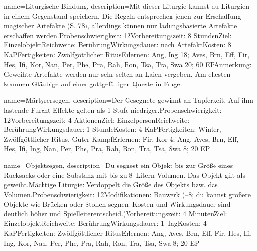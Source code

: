 {
    name={Liturgische Bindung},
    description={Mit dieser Liturgie kannst du Liturgien in einem Gegenstand speichern. Die Regeln entsprechen jenen zur Erschaffung magischer Artefakte (S. 78), allerdings können nur ladungsbasierte Artefakte erschaffen werden.\newline Probenschwierigkeit: 12\newline Vorbereitungszeit: 8 Stunden\newline Ziel: Einzelobjekt\newline Reichweite: Berührung\newline Wirkungsdauer: nach Artefakt\newline Kosten: 8 KaP\newline Fertigkeiten: Zwölfgöttlicher Ritus\newline Erlernen: Ang, Ing 18; Aves, Brn, Eff, Fir, Hes, Ifi, Kor, Nan, Per, Phe, Pra, Rah, Ron, Tsa, Tra, Swa 20; 60 EP\newline Anmerkung: Geweihte Artefakte werden nur sehr selten an Laien vergeben. Am ehesten kommen Gläubige auf einer gottgefälligen Queste in Frage.}
}


{
    name={Märtyrersegen},
    description={Der Gesegnete gewinnt an Tapferkeit. Auf ihm lastende Furcht-Effekte gelten als 1 Stufe niedriger.\newline Probenschwierigkeit: 12\newline Vorbereitungszeit: 4 Aktionen\newline Ziel: Einzelperson\newline Reichweite: Berührung\newline Wirkungsdauer: 1 Stunde\newline Kosten: 4 KaP\newline Fertigkeiten: Winter, Zwölfgöttlicher Ritus, Guter Kampf\newline Erlernen: Fir, Kor 4; Ang, Aves, Brn, Eff, Hes, Ifi, Ing, Nan, Per, Phe, Pra, Rah, Ron, Tra, Tsa, Swa 8; 20 EP}
}


{
    name={Objektsegen},
    description={Du segnest ein Objekt bis zur Größe eines Rucksacks oder eine Substanz mit bis zu 8 Litern Volumen. Das Objekt gilt als geweiht.\newline Mächtige Liturgie: Verdoppelt die Größe des Objekts bzw. das Volumen.\newline Probenschwierigkeit: 12\newline Modifikationen: Bauwerk (–8; du kannst größere Objekte wie Brücken oder Stollen segnen. Kosten und Wirkungsdauer sind deutlich höher und Spielleiterentscheid.)\newline Vorbereitungszeit: 4 Minuten\newline Ziel: Einzelobjekt\newline Reichweite: Berührung\newline Wirkungsdauer: 1 Tag\newline Kosten: 4 KaP\newline Fertigkeiten: Zwölfgöttlicher Ritus\newline Erlernen: Ang, Aves, Brn, Eff, Fir, Hes, Ifi, Ing,  Kor, Nan, Per, Phe, Pra, Rah, Ron, Tra, Tsa, Swa 8; 20 EP}
}


